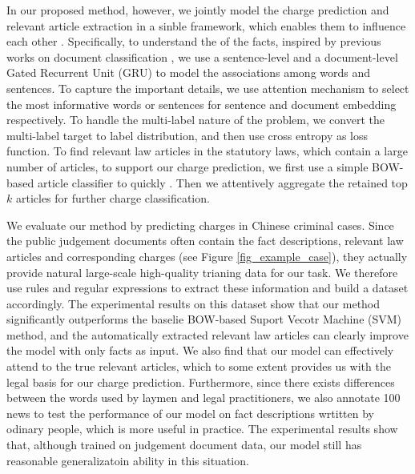 In our proposed method, however, we jointly model the charge prediction and relevant article extraction in a sinble framework, which enables them to influence each other .
Specifically, to understand the  of the facts, inspired by previous works on document classification \cite{tang2015document,yang2016hierarchical}, we use a sentence-level and a document-level Gated Recurrent Unit (GRU) to model the associations among words and sentences.
To capture the important details, we use attention mechanism to select the most informative words or sentences for sentence and document embedding respectively. 
To handle the multi-label nature of the problem, we convert the multi-label target to label distribution, and then use cross entropy as loss function. 
To find relevant law articles in the statutory laws, which contain a large number of articles, to support our charge prediction, we first use a simple BOW-based article classifier to quickly . Then we attentively aggregate the retained top $k$ articles for further charge classification.

We evaluate our method by predicting charges in Chinese criminal cases. 
Since the public judgement documents often contain the fact descriptions, relevant law articles and corresponding charges (see Figure \ref{fig_example_case}), they actually provide natural large-scale high-quality trianing data for our task. 
We therefore use rules and regular expressions to extract these information and build a dataset accordingly. The experimental results on this dataset show that our method significantly outperforms the baselie BOW-based Suport Vecotr Machine (SVM) method, and the automatically extracted relevant law articles can clearly improve the model with only facts as input. We also find that our model can effectively attend to the true relevant articles, which to some extent provides us with the legal basis for our charge prediction. Furthermore, since there exists differences between the words used by laymen and legal practitioners, we also annotate 100 news to test the performance of our model on fact descriptions wrtitten by odinary people, which is more useful in practice. The experimental results show that, although trained on judgement document data, our model still has reasonable generalizatoin ability in this situation.

